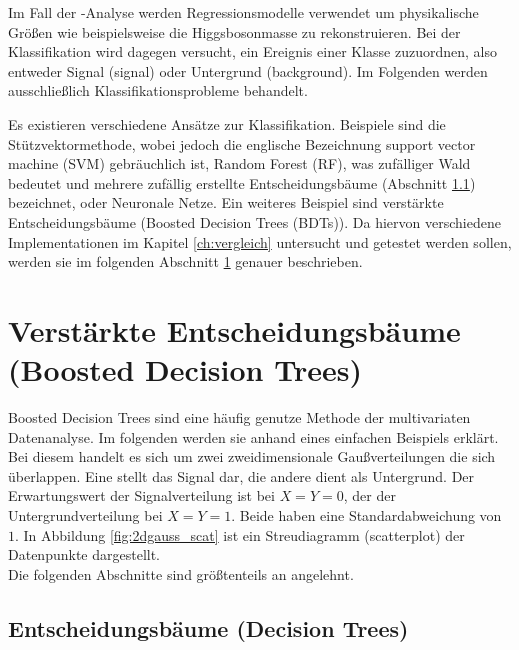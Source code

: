 Im Fall der \ttH-Analyse werden Regressionsmodelle verwendet um physikalische Gr\"o\ss en wie beispielsweise die Higgsbosonmasse zu rekonstruieren. Bei der Klassifikation wird dagegen versucht, ein Ereignis einer Klasse zuzuordnen, also entweder Signal (signal) oder Untergrund (background). Im Folgenden werden ausschlie\ss lich Klassifikationsprobleme behandelt.

Es existieren verschiedene Ans\"atze zur Klassifikation. Beispiele sind die St\"utzvektormethode, wobei jedoch die englische Bezeichnung support vector machine (SVM) gebr\"auchlich ist, Random Forest (RF), was zuf\"alliger Wald bedeutet und mehrere zuf\"allig erstellte Entscheidungsb\"aume (Abschnitt \ref{ch:Algorithmen:subsec:Entscheidungsbaum}) bezeichnet, oder Neuronale Netze. Ein weiteres Beispiel sind verst\"arkte Entscheidungsb\"aume (Boosted Decision Trees (BDTs)). Da hiervon verschiedene Implementationen im Kapitel \ref{ch:vergleich} untersucht und getestet werden sollen, werden sie im folgenden Abschnitt \ref{ch:Algorithmen:sec:BDT} genauer beschrieben.

\section{Verst\"arkte Entscheidungsb\"aume (Boosted Decision Trees)}
\label{ch:Algorithmen:sec:BDT}

Boosted Decision Trees sind eine h\"aufig genutze Methode der multivariaten Datenanalyse. Im folgenden werden sie anhand eines einfachen Beispiels erkl\"art. Bei diesem handelt es sich um zwei zweidimensionale Gau\ss verteilungen die sich \"uberlappen. Eine stellt das Signal dar, die andere dient als Untergrund. Der Erwartungswert der Signalverteilung ist bei $X=Y=0$, der der Untergrundverteilung bei $X=Y=1$. Beide haben eine Standardabweichung von $1$. In Abbildung \ref{fig:2dgauss_scat} ist ein Streudiagramm (scatterplot) der Datenpunkte dargestellt.\\
Die folgenden Abschnitte sind gr\"o\ss tenteils an \cite{SWB-307748006} angelehnt.

\subsection{Entscheidungsb\"aume (Decision Trees)}
\label{ch:Algorithmen:subsec:Entscheidungsbaum}

